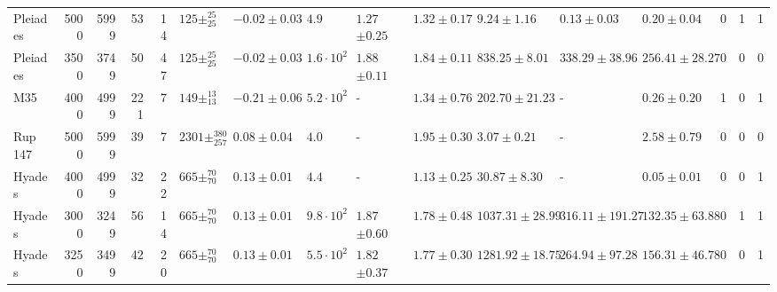 \begin{tabular}{lrrrrllllllllrrr}
 Pleiades &                           5000 &                           5999 &     53 &                   14 &     $125\pm _{25}^{25}$ &  $-0.02\pm0.03$ &                      $4.9$ &     $1.27$$\pm0.25$ &        $1.32\pm0.17$ &                 $9.24\pm1.16$ &                          $0.13\pm0.03$ &                           $0.20\pm0.04$ &       0 &                1 &                 1 \\
 Pleiades &                           3500 &                           3749 &     50 &                   47 &     $125\pm _{25}^{25}$ &  $-0.02\pm0.03$ &        $1.6 \cdot 10^{2}$ &     $1.88$$\pm0.11$ &        $1.84\pm0.11$ &               $838.25\pm8.01$ &                       $338.29\pm38.96$ &                        $256.41\pm28.27$ &       0 &                0 &                 0 \\
      M35 &                           4000 &                           4999 &    221 &                    7 &     $149\pm _{13}^{13}$ &  $-0.21\pm0.06$ &        $5.2 \cdot 10^{2}$ &                   - &        $1.34\pm0.76$ &              $202.70\pm21.23$ &                                      - &                           $0.26\pm0.20$ &       1 &                0 &                 1 \\
  Rup 147 &                           5000 &                           5999 &     39 &                    7 &  $2301\pm _{257}^{380}$ &   $0.08\pm0.04$ &                      $4.0$ &                   - &        $1.95\pm0.30$ &                 $3.07\pm0.21$ &                                      - &                           $2.58\pm0.79$ &       0 &                0 &                 0 \\
   Hyades &                           4000 &                           4999 &     32 &                   22 &     $665\pm _{70}^{70}$ &   $0.13\pm0.01$ &                      $4.4$ &                   - &        $1.13\pm0.25$ &                $30.87\pm8.30$ &                                      - &                           $0.05\pm0.01$ &       0 &                0 &                 1 \\
   Hyades &                           3000 &                           3249 &     56 &                   14 &     $665\pm _{70}^{70}$ &   $0.13\pm0.01$ &        $9.8 \cdot 10^{2}$ &     $1.87$$\pm0.60$ &        $1.78\pm0.48$ &             $1037.31\pm28.99$ &                      $316.11\pm191.27$ &                        $132.35\pm63.88$ &       0 &                1 &                 1 \\
   Hyades &                           3250 &                           3499 &     42 &                   20 &     $665\pm _{70}^{70}$ &   $0.13\pm0.01$ &        $5.5 \cdot 10^{2}$ &     $1.82$$\pm0.37$ &        $1.77\pm0.30$ &             $1281.92\pm18.75$ &                       $264.94\pm97.28$ &                        $156.31\pm46.78$ &       0 &                0 &                 1 \\

\end{tabular}
